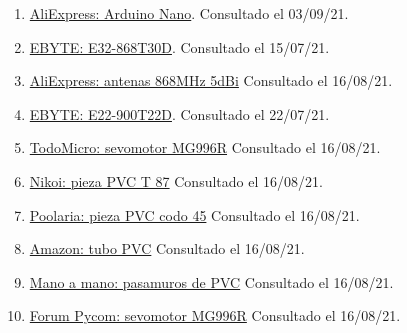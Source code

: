 \documentclass[12pt]{article}
\begin{document}
\begin{enumerate}
				\item
				\label{arduino nano front and rear}
				\href{https://es.aliexpress.com/item/898608940.html}{AliExpress: Arduino Nano}. Consultado el 03/09/21.
				
				\item 
				\label{bib: imagen E32}
				\href{https://www.ebyte.com/en/product-view-news.aspx?id=189}{EBYTE: E32-868T30D}. Consultado el 15/07/21.
				
				\item 
				\label{bib: AliExpress}
				\href{https://es.aliexpress.com/item/32972870968.html?spm=a2g0s.9042311.0.0.274263c0xMPROA}{AliExpress: antenas 868MHz 5dBi}	Consultado el 16/08/21.			
				
				\item 
				\label{bib: imagen E22}
				\href{https://www.ebyte.com/en/product-view-news.html?id=1117}{EBYTE: E22-900T22D}. Consultado el 22/07/21.
				
				\item 
				\label{bib: todomicro}
				\href{https://www.todomicro.com.ar/motores-y-drivers-motores/234-servomotor-mg996r-digital-10kg-torque.html}{TodoMicro: sevomotor MG996R} Consultado el 16/08/21.
				
				\item 
				\label{bib: Nikoi ferreteria}
				\href{https://www.nikoi.nl/es/pvc-t-stuk-87-125-mm-3-x-mof}{Nikoi: pieza PVC T 87\degree} Consultado el 16/08/21.
				
				\item 
				\label{bib: Poolaria}
				\href{https://www.poolaria.com/accesorios-de-pvc/317-codo-45-pvc-encolar.html}{Poolaria: pieza PVC codo 45\degree} Consultado el 16/08/21.
				
				\item 
				\label{bib: Amazon}
				\href{https://www.amazon.es/Di\%C3\%A1metro-\%C3\%A1ngulo-Rodillera-muffen-Fittings/dp/B017SXJFAM}{Amazon: tubo PVC} Consultado el 16/08/21.
				
				\item 
				\label{bib: mano a mano}
				\href{https://www.manomano.es/p/63-mm-21-2-pasamuros-de-pvc-para-tuberias-63-mm-27277644}{Mano a mano: pasamuros de PVC} Consultado el 16/08/21.
				
				\item 
				\label{bib: forum pycom}
				\href{https://forum.pycom.io/topic/982/mg996r-pwm-3v3-solved}{Forum Pycom: sevomotor MG996R} Consultado el 16/08/21.
				

\end{enumerate}
\end{document}
